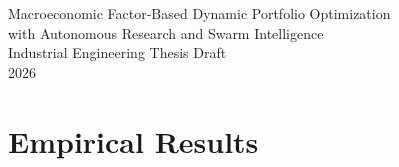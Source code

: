 \documentclass[12pt,a4paper]{report}
\begin{document}

\begin{titlepage}
\centering
{\Large Macroeconomic Factor-Based Dynamic Portfolio Optimization\\}
\vspace{0.3cm}
{\Large with Autonomous Research and Swarm Intelligence\\}
\vspace{1.5cm}
{\large Industrial Engineering Thesis Draft\\}
\vfill
{\large 2026\\}
\end{titlepage}

\tableofcontents
\listoftables
\listoffigures

\clearpage
{}

%

\chapter{Empirical Results}

%
% 
\end{document}
